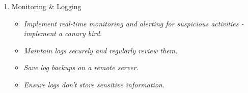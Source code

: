 \begin{enumerate}
\begin{itemize}
	      \end{itemize}
	\item Monitoring \& Logging
	      \begin{itemize}
		      \item \textit{Implement real-time monitoring and alerting for suspicious activities - implement a canary bird.}
		      \item \textit{Maintain logs securely and regularly review them.}
		      \item \textit{Save log backups on a remote server.}
		      \item \textit{Ensure logs don't store sensitive information.}
	      \end{itemize}
\end{enumerate}
